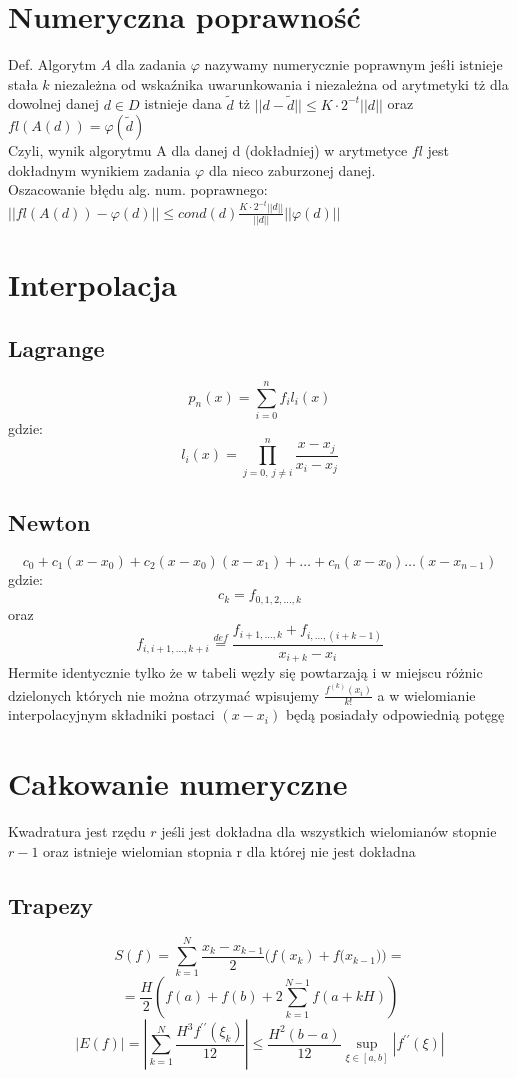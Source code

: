 \documentclass[twocolumn]{article}
\begin{document}
\begin{flushleft}
\section{Numeryczna poprawność}
Def. Algorytm $A$ dla zadania $\varphi$ nazywamy numerycznie poprawnym jeśłi istnieje stała $k$ niezależna od wskaźnika uwarunkowania i niezależna od arytmetyki tż dla dowolnej danej $d \in D$ istnieje dana $\widetilde{d}$ tż $||d-\widetilde{d}|| \leq K\cdot 2^{-t}||d||$ oraz $fl(A(d)) = \varphi(\widetilde{d})$\\
Czyli, wynik algorytmu A dla danej d (dokładniej) w arytmetyce $fl$ jest dokładnym wynikiem zadania $\varphi$ dla nieco zaburzonej danej.\\
Oszacowanie błędu alg. num. poprawnego:\\
$||fl(A(d)) - \varphi(d)|| \leq cond(d) \frac{K\cdot2^{-t}||d||}{||d||}||\varphi(d)||$

\section{Interpolacja}
\subsection{Lagrange}
$$p_{n}(x) = \sum_{i=0}^{n}f_{i}l_{i}(x)$$
gdzie: $$l_i(x) = \prod_{{j = 0},\ {j \neq i}}^{n} \frac{x - x_{j}}{x_{i} - x_{j}}$$
\subsection{Newton}
$$c_{0} + c_{1}(x-x_{0}) + c_{2}(x-x_{0})(x-x_{1}) + \ldots + c_{n}(x-x_{0})\ldots (x-x_{n-1})$$
gdzie: $$c_{k} = f_{0,1,2,\ldots,k}$$ oraz $$f_{i,i+1,\ldots,k+i} \stackrel{def}{=} \frac{f_{i+1,\ldots,k} + f_{i,\ldots,(i+k-1)}}{x_{i+k}-x_{i}}$$
Hermite identycznie tylko że w tabeli węzły się powtarzają i w miejscu różnic dzielonych których nie można otrzymać wpisujemy $\frac{f^{(k)}(x_i)}{k!}$ a w wielomianie interpolacyjnym składniki postaci $(x-x_i)$ będą posiadały odpowiednią potęgę

\section{Całkowanie numeryczne}
Kwadratura jest rzędu $r$ jeśli jest dokładna dla wszystkich wielomianów stopnie $r-1$ oraz istnieje wielomian stopnia r dla której nie jest dokładna\\
\subsection{Trapezy}
$$S(f) = \sum_{k=1}^{N} \frac{x_k - x_{k-1}}{2}{(f(x_k) + f(x_{k-1}})) =$$ $$=\frac{H}{2} \left(f(a)+f(b)+2\sum_{k=1}^{N-1}f(a + kH)\right)$$
$$|E(f)| = \left| \sum_{k=1}^{N}\frac{H^3f^{\prime\prime}(\xi_k)}{12} \right| \leq \frac{H^2(b-a)}{12}\underset{\xi \in [a,b]}{\sup}|f^{\prime\prime} (\xi)|$$

\end{flushleft}
\end{document}
